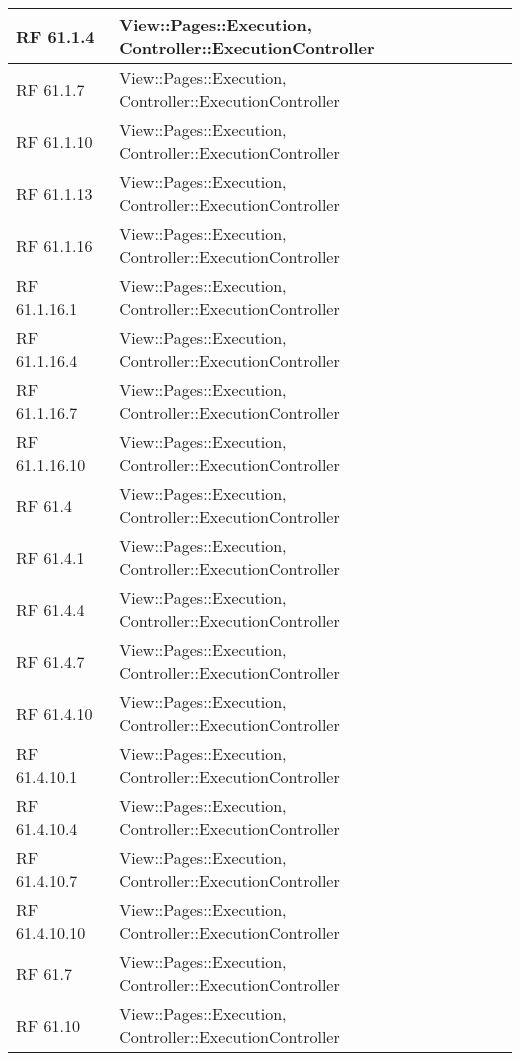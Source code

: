 {\begin{longtable} [c]{| p{2cm} | p{14cm} |}
RF 61.1.4 & View::\-Pages::\-\-Execution, Controller::\-\-ExecutionController\\ 
 \hline 
RF 61.1.7 & View::\-Pages::\-\-Execution, Controller::\-\-ExecutionController\\ 
 \hline 
RF 61.1.10 & View::\-Pages::\-\-Execution, Controller::\-\-ExecutionController\\ 
 \hline 
RF 61.1.13 & View::\-Pages::\-\-Execution, Controller::\-\-ExecutionController\\ 
 \hline 
RF 61.1.16 & View::\-Pages::\-\-Execution, Controller::\-\-ExecutionController\\ 
 \hline 
RF 61.1.16.1 & View::\-Pages::\-\-Execution, Controller::\-\-ExecutionController\\ 
 \hline 
RF 61.1.16.4 & View::\-Pages::\-\-Execution, Controller::\-\-ExecutionController\\ 
 \hline 
RF 61.1.16.7 & View::\-Pages::\-\-Execution, Controller::\-\-ExecutionController\\ 
 \hline 
RF 61.1.16.10 & View::\-Pages::\-\-Execution, Controller::\-\-ExecutionController\\ 
 \hline 
RF 61.4 & View::\-Pages::\-\-Execution, Controller::\-\-ExecutionController\\ 
 \hline 
RF 61.4.1 & View::\-Pages::\-\-Execution, Controller::\-\-ExecutionController\\ 
 \hline 
RF 61.4.4 & View::\-Pages::\-\-Execution, Controller::\-\-ExecutionController\\ 
 \hline 
RF 61.4.7 & View::\-Pages::\-\-Execution, Controller::\-\-ExecutionController\\ 
 \hline 
RF 61.4.10 & View::\-Pages::\-\-Execution, Controller::\-\-ExecutionController\\ 
 \hline 
RF 61.4.10.1 & View::\-Pages::\-\-Execution, Controller::\-\-ExecutionController\\ 
 \hline 
RF 61.4.10.4 & View::\-Pages::\-\-Execution, Controller::\-\-ExecutionController\\ 
 \hline 
RF 61.4.10.7 & View::\-Pages::\-\-Execution, Controller::\-\-ExecutionController\\ 
 \hline 
RF 61.4.10.10 & View::\-Pages::\-\-Execution, Controller::\-\-ExecutionController\\ 
 \hline 
RF 61.7 & View::\-Pages::\-\-Execution, Controller::\-\-ExecutionController\\ 
 \hline 
RF 61.10 & View::\-Pages::\-\-Execution, Controller::\-\-ExecutionController\\ 

\end{longtable}}
